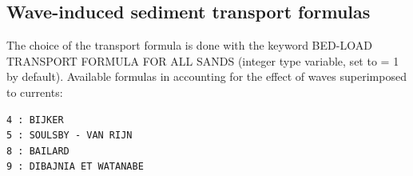 \subsection{Wave-induced sediment transport formulas}
The choice of the transport formula is done with the keyword {\ttfamily BED-LOAD TRANSPORT FORMULA FOR ALL SANDS} (integer type variable, set to {\ttfamily = 1} by default). Available formulas in \gaia{} accounting for the effect of waves superimposed to currents:
\begin{lstlisting}[frame=trBL]
4 : BIJKER
5 : SOULSBY - VAN RIJN
8 : BAILARD
9 : DIBAJNIA ET WATANABE
\end{lstlisting}

